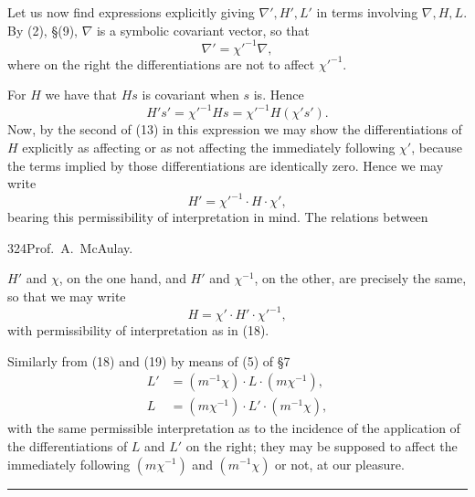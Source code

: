 \documentclass[11pt]{article}
\begin{document}
\indent Let us now find expressions explicitly giving $\nabla',H',L'$ in terms involving $\nabla,H,L$. By (2), §(9), $\nabla$ is a symbolic covariant vector, so that
\begin{equation}\nabla'=\chi'^{-1}\nabla,\tag{17}\end{equation}
where on the right the differentiations are not to affect $\chi'^{-1}$.

\indent For $H$ we have that $Hs$ is covariant when $s$ is. Hence
\[
H's'=\chi'^{-1}Hs=\chi'^{-1}H(\chi's').
\]
Now, by the second of (13) in this expression we may show the differentiations of $H$ explicitly as affecting or as not affecting the immediately following $\chi'$, because the terms implied by those differentiations are identically zero. Hence we may write
\begin{equation}H'=\chi'^{-1}\cdot H\cdot\chi',\tag{18}\end{equation}
bearing this permissibility of interpretation in mind. The relations between

\newpage\thispagestyle{empty}\begin{center}324\hfill Prof.\ A.\ McAulay.\end{center}
$H'$ and $\chi$, on the one hand, and $H'$ and $\chi^{-1}$, on the other, are precisely the same, so that we may write
\begin{equation}H=\chi'\cdot H'\cdot\chi'^{-1},\tag{19}\end{equation}
with permissibility of interpretation as in (18).

\indent Similarly from (18) and (19) by means of (5) of §7
\begin{align}
L'&=(m^{-1}\chi)\cdot L\cdot(m\chi^{-1}),\tag{20}\\
L&=(m\chi^{-1})\cdot L'\cdot(m^{-1}\chi),\tag{21}
\end{align}
with the same permissible interpretation as to the incidence of the application of the differentiations of $L$ and $L'$ on the right; they may be supposed to affect the immediately following $(m\chi^{-1})$ and $(m^{-1}\chi)$ or not, at our pleasure.

\vspace{1.5cm}
\begin{center}\rule{0.28\textwidth}{0.8pt}\end{center}
\end{document}
